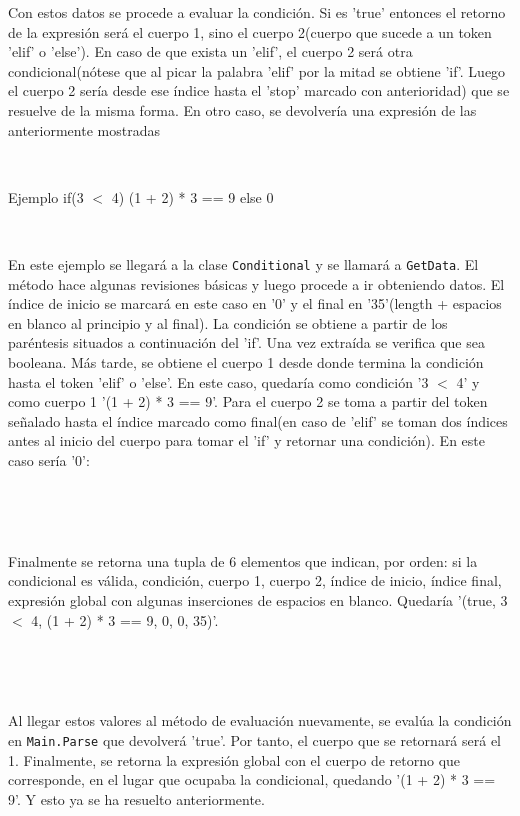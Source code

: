 \documentclass{article}
\begin{document}
Con estos datos se procede a evaluar la condición. Si es 'true' entonces el retorno de la expresión será el cuerpo 1, 
sino el cuerpo 2(cuerpo que sucede a un token 'elif' o 'else'). En caso de que exista un 'elif', el cuerpo 2 será 
otra condicional(nótese que al picar la palabra 'elif' por la mitad se obtiene 'if'. Luego el cuerpo 2 sería desde
ese índice hasta el 'stop' marcado con anterioridad) que se resuelve de la misma forma. En otro caso, se devolvería 
una expresión de las anteriormente mostradas


\


Ejemplo if(3 $<$ 4) (1 + 2) * 3 == 9 else 0


\


En este ejemplo se llegará a la clase {\texttt{Conditional}} y se llamará a {\texttt{GetData}}. El método hace algunas
revisiones básicas y luego procede a ir obteniendo datos. El índice de inicio se marcará en este caso en '0' y el final
en '35'(length + espacios en blanco al principio y al final). La condición se obtiene a partir de los paréntesis situados 
a continuación del 'if'. Una vez extraída se verifica que sea booleana. Más tarde, se obtiene el cuerpo 1 desde donde termina 
la condición hasta el token 'elif' o 'else'. En este caso, quedaría como condición '3 $<$ 4' y como cuerpo 1 '(1 + 2) * 3 == 9'. 
Para el cuerpo 2 se toma a partir del token señalado hasta el índice marcado como final(en caso de 'elif' se toman dos índices antes 
al inicio del cuerpo para tomar el 'if' y retornar una condición). En este caso sería '0':


\ 




\


Finalmente se retorna una tupla de 
6 elementos que indican, por orden: si la condicional es válida, condición, cuerpo 1, cuerpo 2, índice de inicio, 
índice final, expresión global con algunas inserciones de espacios en blanco. Quedaría '(true, 3 $<$ 4, (1 + 2) * 3 == 9, 
0, 0, 35)'.


\ 




\


Al llegar estos valores al método de evaluación nuevamente, se evalúa la condición en {\texttt{Main.Parse}} que devolverá
'true'. Por tanto, el cuerpo que se retornará será el 1. Finalmente, se retorna la expresión global con el cuerpo de 
retorno que corresponde, en el lugar que ocupaba la condicional, quedando '(1 + 2) * 3 == 9'. Y esto ya se ha resuelto
anteriormente.
\end{document}
